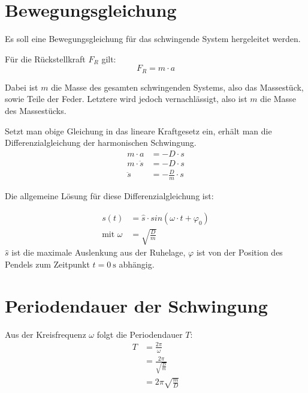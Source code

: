 \section{Bewegungsgleichung}
Es soll eine Bewegungsgleichung für das schwingende System hergeleitet werden.

Für die Rückstellkraft $F_R$ gilt:
$$F_R = m \cdot a$$

Dabei ist $m$ die Masse des gesamten schwingenden Systems, also das Massestück, sowie Teile der Feder. Letztere wird jedoch vernachlässigt, also ist $m$ die Masse des Massestücks.

Setzt man obige Gleichung in das lineare Kraftgesetz ein, erhält man die Differenzialgleichung der harmonischen Schwingung.
\begin{align*}
m \cdot a &= -D \cdot s \\
m \cdot \ddot s &= -D \cdot s \\
\ddot s &= -\frac{D}{m} \cdot s
\end{align*}

Die allgemeine Lösung für diese Differenzialgleichung ist:

\begin{align*}
s(t) &= \hat s \cdot sin(\omega \cdot t + \varphi_0) \\
\text{mit } \omega &= \sqrt{\frac{D}{m}}
\end{align*}
$\hat s$ ist die maximale Auslenkung aus der Ruhelage, $\varphi$ ist von der Position des Pendels zum Zeitpunkt $t = \SI{0}{\second}$ abhängig.

\section{Periodendauer der Schwingung}
Aus der Kreisfrequenz $\omega$ folgt die Periodendauer $T$:
\begin{align*}
T &= \frac{2\pi}{\omega} \\
  &= \frac{2\pi}{\sqrt{\frac{D}{m}}} \\
  &= 2\pi\sqrt{\frac{m}{D}}
\end{align*}